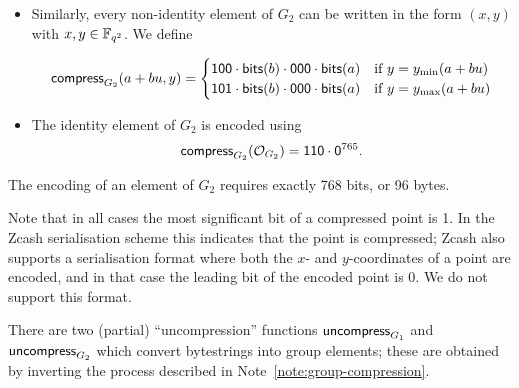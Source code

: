 \medskip 

\noindent 
\begin{itemize}
\item Similarly, every non-identity element of $G_2$ can be written
in the form $(x,y)$ with $x,y \in \mathbb{F}_{q^2}$.  We define

$$
\mathsf{compress}_{G_2} (a+bu,y) = \begin{cases}
\mathsf{1}\mathsf{0}\mathsf{0}\cdot\mathsf{bits}(b)\cdot\mathsf{0}\mathsf{0}\mathsf{0}\cdot\mathsf{bits}(a)
& \text{if $y=y_{\text{min}}(a+bu)$}\\
\mathsf{1}\mathsf{0}\mathsf{1}\cdot\mathsf{bits}(b)\cdot\mathsf{0}\mathsf{0}\mathsf{0}\cdot\mathsf{bits}(a) &
 \text{if $y=y_{\text{max}}(a+bu)$}\\
\end{cases}
$$

\item The identity element of $G_2$ is encoded using
$$
\mathsf{compress}_{G_2}(\mathcal{O}_{G_2}) = \mathsf{1}\mathsf{1}\mathsf{0}\cdot\mathsf{0}^{765}.
$$

\end{itemize}
\noindent The encoding of an element of $G_2$ requires exactly 768 bits, or 96 bytes.

Note that in all cases the most significant bit of a compressed point is 1.  In
the Zcash serialisation scheme this indicates that the point is compressed;
Zcash also supports a serialisation format where both the $x$- and
$y$-coordinates of a point are encoded, and in that case the leading bit of the
encoded point is 0.  We do not support this format.

\label{note:group-uncompression}
There are two (partial) ``uncompression'' functions $\mathsf{uncompress}_{G_1}$ and
$\mathsf{uncompress}_{G_2}$ which convert bytestrings into group elements; these are
obtained by inverting the process described in
Note~\ref{note:group-compression}.

